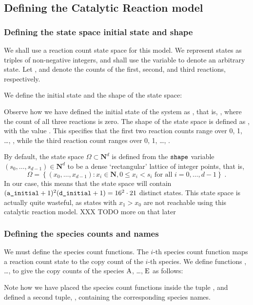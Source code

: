 \subsection{Defining the Catalytic Reaction model}
\subsubsection{Defining the state space initial state and shape}
We shall use a reaction count state space for this model. We represent states as
triples of non-negative integers, and shall use the variable  to
denote an arbitrary state. Let ,  and  denote
the counts of the first, second, and third reactions, respectively.

We define the initial state and the shape of the state space:

Observe how we have defined the initial state of the system as ,
that is, , where the count of all three reactions is zero.
The shape of the state space is defined as , with the value
. This specifies that the first
two reaction counts range over 0, 1, \ldots, , while the third
reaction count ranges over 0, 1, \ldots, .

By default, the state space $\Omega \subset \mathbf{N}^d$ is defined from the
$\texttt{shape}$ variable $(s_0, \ldots, s_{d-1}) \in \mathbf{N}^d$ to be a dense
`rectangular' lattice of integer points, that is,
\begin{equation*}
\Omega = \left\{ (x_0, \ldots, x_{d-1}) : 
\textrm{$x_i \in \mathbf{N}, 0 \leq x_i < s_i$ for all $i = 0, \ldots, d-1$}
\right\} \; .
\end{equation*}
In our case, this means that the state space will contain
$(\texttt{a\_initial} + 1)^2 (\texttt{d\_initial} + 1) = 16^2 \cdot 21$ distinct
states. This state space is actually quite wasteful, as states with $x_1 >
x_0$ are not reachable using this catalytic reaction model. XXX TODO more on
that later

\subsubsection{Defining the species counts and names}
We must define the species count functions. The $i$-th
species count function maps a reaction count state  to the copy count of
the $i$-th species.
We define functions , \ldots,  to give the copy counts of
the species $ \textrm{{A}} $, \ldots, $ \textrm{{E}} $ as follows:

Note how we have placed the species count functions inside the tuple
, and defined a second tuple, , containing
the corresponding species names.

